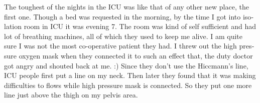 \begin{english}
The toughest of the nights in the ICU was like that of any other new place, the first one. Though a bed was requested in the morning, by the time I got into isolation room in ICU it was evening 7. The room was kind of self sufficient and had lot of breathing machines, all of which they used to keep me alive. I am quite sure I was not the most co-operative patient they had. I threw out the high pressure oxygen mask when they connected it to such an effect that, the duty doctor got angry and shouted back at me. :) Since they don't use the Hiccmann's line, ICU people first put a line on my neck. Then later they found that it was making difficulties to flows while high pressure mask is connected. So they put one more line just above the thigh on my pelvis area. 
\end{english}
\newpage
